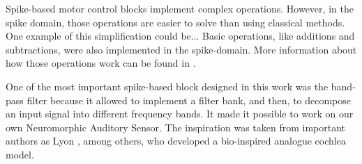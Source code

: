 Spike-based motor control blocks implement complex operations. However, in the spike domain, those operations are easier to solve than using classical methods. One example of this simplification could be... Basic operations, like additions and subtractions, were also implemented in the spike-domain. More information about how those operations work can be found in \cite{jimenez2010building}.


One of the most important spike-based block designed in this work was the band-pass filter because it allowed to implement a filter bank, and then, to decompose an input signal into different frequency bands. It made it possible to work on our own Neuromorphic Auditory Sensor. The inspiration was taken from important authors as Lyon \cite{lyon1988analog}, among others, who developed a bio-inspired analogue cochlea model.

